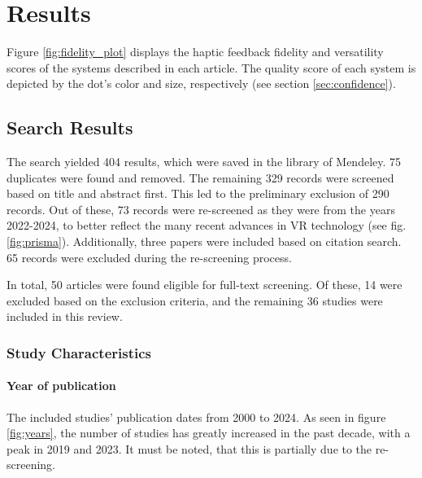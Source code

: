 \section{Results}
\label{sec:results}

Figure \ref{fig:fidelity_plot} displays the haptic feedback fidelity and versatility scores of the systems described in each article. The quality score of each system is depicted by the dot's color and size, respectively (see section \ref{sec:confidence}).


\subsection{Search Results}

The search yielded 404 results, which were saved in the library of Mendeley. 75 duplicates were found and removed. The remaining 329 records were screened based on title and abstract first. This led to the preliminary exclusion of 290 records. Out of these, 73 records were re-screened as they were from the years 2022-2024, to better reflect the many recent advances in VR technology (see fig. \ref{fig:prisma}). 
Additionally, three papers were included based on citation search. 65 records were excluded during the re-screening process.

In total, 50 articles were found eligible for full-text screening. Of these, 14 were excluded based on the exclusion criteria, and the remaining 36 studies were included in this review.


\subsubsection{Study Characteristics}
\paragraph{Year of publication}
The included studies' publication dates from 2000 to 2024. As seen in figure \ref{fig:years}, the number of studies has greatly increased in the past decade, with a peak in 2019 and 2023. It must be noted, that this is partially due to the re-screening. 


